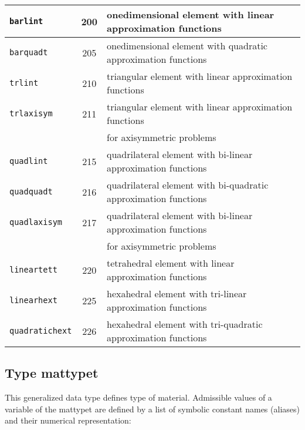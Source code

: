 \begin{center}
\begin{tabular}{|l|c|l|}
\hline
{\tt barlint} & 200 & onedimensional element with linear approximation functions
\\ \hline
{\tt barquadt} & 205 & onedimensional element with quadratic approximation functions
\\ \hline
{\tt trlint} & 210 & triangular element with linear approximation functions
\\ \hline
{\tt trlaxisym} & 211 & triangular element with linear approximation functions\\ & & for axisymmetric problems
\\ \hline
{\tt quadlint} & 215 & quadrilateral element with bi-linear approximation functions
\\ \hline
{\tt quadquadt} & 216 & quadrilateral element with bi-quadratic approximation functions
\\ \hline
{\tt quadlaxisym} & 217 & quadrilateral element with bi-linear approximation functions\\ & & for axisymmetric problems
\\ \hline
{\tt lineartett} & 220 & tetrahedral element with linear approximation functions
\\ \hline
{\tt linearhext} & 225 & hexahedral element with tri-linear approximation functions
\\ \hline
{\tt quadratichext} & 226 & hexahedral element with tri-quadratic approximation functions
\\ \hline
\end{tabular}
\end{center}

\subsection{Type {\sf mattypet}}
\label{sectmattypet}

This generalized data type defines type of material.
Admissible values of a variable of the {\sf mattypet} are defined by a list of symbolic constant names (aliases)
and their numerical representation:

